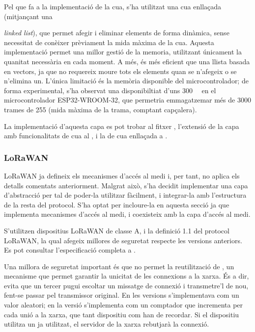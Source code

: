 \documentclass{tfgitic}[2024/07/01]
\begin{document}
Pel que fa a la implementació de la cua, s'ha utilitzat una cua enllaçada (mitjançant una {\emph{linked list}), que permet afegir i eliminar elements de forma dinàmica, sense necessitat de conèixer prèviament la mida màxima de la cua. Aquesta implementació permet una millor gestió de la memoria, utilitzant únicament la quanitat necessària en cada moment. A més, és més eficient que una llista basada en vectors, ja que no requereix moure tots els elements quan se n'afegeix o se n'elimina un. L'única limitació és la memòria disponible del microcontrolador; de forma experimental, s'ha observat una disponibiltiat d'uns \SI{300}{\kilo\byte} en el microcontrolador ESP32-WROOM-32, que permetria emmagatzemar més de \num{3000} trames de \SI{255}{\byte} (mida màxima de la trama, comptant capçalera).

La implementació d'aquesta capa es pot trobar al fitxer , l'extensió de la capa amb funcionalitats de cua al , i la de cua enllaçada a .
\subsubsection{LoRaWAN}
\label{subsubsec:mac_lorawan}
LoRaWAN ja defineix els mecanismes d'accés al medi i, per tant, no aplica els detalls comentats anteriorment. Malgrat això, s'ha decidit implementar una capa d'abstracció per tal de poder-la utilitzar fàcilment, i integrar-la amb l'estructura de la resta del protocol. S'ha optat per incloure-la en aquesta secció ja que implementa mecanismes d'accés al medi, i coexisteix amb la capa d'accés al medi.

S'utilitzen dispositius LoRaWAN de classe A, i la definició 1.1 del protocol LoRaWAN, la qual afegeix millores de seguretat respecte les versions  anteriors. Es pot consultar l'especificació completa a \cite{noauthor_lorawan_2023}.

Una millora de seguretat important és que no permet la reutilització de , un mecanisme que permet garantir la unicitat de les connexions a la xarxa. És a dir, evita que un tercer pugui escoltar un missatge de connexió i transmetre'l de nou, fent-se passar pel transmissor original. En les versions  s'implementava com un valor aleatori; en la versió  s'implementa com un comptador que incrementa per cada unió a la xarxa, que tant dispositiu com  han de recordar. Si el dispositiu utilitza un  ja utilitzat, el servidor de la xarxa rebutjarà la connexió. 

}
\end{document}
